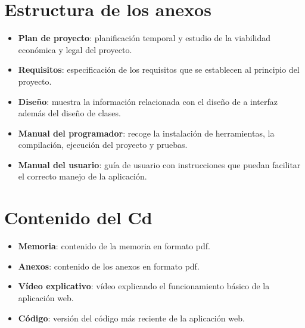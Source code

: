 \section{Estructura de los anexos}
\begin{itemize}
	\item \textbf{Plan de proyecto}: planificación temporal y estudio de la viabilidad económica y legal del proyecto.
	\item \textbf{Requisitos}: especificación de los requisitos que se establecen al principio del proyecto.
	\item \textbf{Diseño}: muestra la información relacionada con el diseño de a interfaz además del diseño de clases.
	\item \textbf{Manual del programador}: recoge la instalación de herramientas, la compilación, ejecución del proyecto y pruebas.
	\item \textbf{Manual del usuario}: guía de usuario con instrucciones que puedan facilitar el correcto manejo de la aplicación.
\end{itemize}

\section{Contenido del Cd}
\begin{itemize}
	\item \textbf{Memoria}: contenido de la memoria en formato pdf.
	\item \textbf{Anexos}: contenido de los anexos en formato pdf.
	\item \textbf{Vídeo explicativo}: vídeo explicando el funcionamiento básico de la aplicación web.
	\item \textbf{Código}: versión del código más reciente de la aplicación web.  	
\end{itemize}
